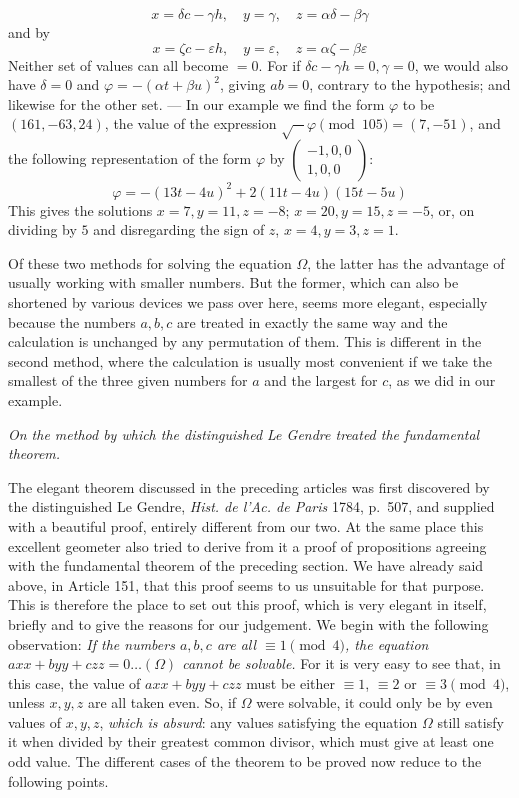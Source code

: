 \[
x=\delta c-\gamma h,\quad y=\gamma,\quad z=\alpha\delta-\beta\gamma
\]
and by
\[
x=\zeta c-\varepsilon h,\quad y=\varepsilon,\quad z=\alpha\zeta-\beta\varepsilon
\]
Neither set of values can all become \(=0\). For if \(\delta c-\gamma h=0,\gamma=0\),
we would also have \(\delta=0\) and \(\varphi=-(\alpha t+\beta u)^2\), giving \(ab=0\), contrary
to the hypothesis; and likewise for the other set. --- In our example
we find the form \(\varphi\) to be \((161,-63,24)\), the value of the expression
\(\surd-\varphi\pmod{105}=(7,-51)\), and the following representation of the form \(\varphi\) by
\(\left(\begin{smallmatrix}-1,0,0\\1,0,0\end{smallmatrix}\right)\):
\[
\varphi=-(13t-4u)^2+2(11t-4u)(15t-5u)
\]
This gives the solutions \(x=7,y=11,z=-8\); \(x=20,y=15,z=-5\), or, on dividing by
\(5\) and disregarding the sign of \(z\), \(x=4,y=3,z=1\).

Of these two methods for solving the equation \(\Omega\), the latter
has the advantage of usually working with smaller numbers. But the
former, which can also be shortened by various devices we pass over
here, seems more elegant, especially because the numbers \(a,b,c\)
are treated in exactly the same way and the calculation is unchanged
by any permutation of them. This is different in the second method,
where the calculation is usually most convenient if we take the
smallest of the three given numbers for \(a\) and the largest
for \(c\), as we did in our example.

\begin{center}\itshape On the method by which the distinguished Le Gendre treated the fundamental theorem.\end{center}
The elegant theorem discussed in the preceding articles was first
discovered by the distinguished Le Gendre, \emph{Hist. de l'Ac. de
Paris} 1784, p.\ 507, and supplied with a beautiful proof, entirely
different from our two. At the same place this excellent geometer
also tried to derive from it a proof of propositions agreeing with
the fundamental theorem of
the preceding section. We have already said above, in Article 151,
that this proof seems to us unsuitable for that purpose. This is
therefore the place to set out this proof, which is very elegant
in itself, briefly and to give the reasons for our judgement. We
begin with the following observation: \emph{If the numbers \(a,b,c\)
are all \(\equiv1\pmod4\), the equation \(axx+byy+czz=0\ldots(\Omega)\) cannot be solvable.} For it
is very easy to see that, in this case, the value of \(axx+byy+czz\) must
be either \(\equiv1\), \(\equiv2\) or \(\equiv3\pmod4\), unless \(x,y,z\) are all
taken even. So, if \(\Omega\) were solvable, it could only be by even
values of \(x,y,z\), \emph{which is absurd}: any values satisfying
the equation \(\Omega\) still satisfy it when divided by their greatest
common divisor, which must give at least one odd value. The different
cases of the theorem to be proved now reduce to the following points.

